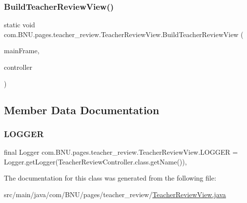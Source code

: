 \subsubsection{\texorpdfstring{Build\+Teacher\+Review\+View()}{BuildTeacherReviewView()}}
{\footnotesize\ttfamily static void com.\+B\+N\+U.\+pages.\+teacher\+\_\+review.\+Teacher\+Review\+View.\+Build\+Teacher\+Review\+View (\begin{DoxyParamCaption}\item[{J\+Frame}]{main\+Frame,  }\item[{\mbox{\hyperlink{classcom_1_1_b_n_u_1_1pages_1_1teacher__review_1_1_teacher_review_controller}{Teacher\+Review\+Controller}}}]{controller }\end{DoxyParamCaption})\hspace{0.3cm}{\ttfamily [static]}}



\subsection{Member Data Documentation}
\mbox{\label{classcom_1_1_b_n_u_1_1pages_1_1teacher__review_1_1_teacher_review_view_a5287bd83c7148003b4a49b88133bbc53}} 
\subsubsection{\texorpdfstring{L\+O\+G\+G\+ER}{LOGGER}}
{\footnotesize\ttfamily final Logger com.\+B\+N\+U.\+pages.\+teacher\+\_\+review.\+Teacher\+Review\+View.\+L\+O\+G\+G\+ER = Logger.\+get\+Logger(Teacher\+Review\+Controller.\+class.\+get\+Name())\hspace{0.3cm}{\ttfamily [static]}, {\ttfamily [private]}}



The documentation for this class was generated from the following file\+:\begin{DoxyCompactItemize}
\item 
src/main/java/com/\+B\+N\+U/pages/teacher\+\_\+review/\mbox{\hyperlink{_teacher_review_view_8java}{Teacher\+Review\+View.\+java}}\end{DoxyCompactItemize}
